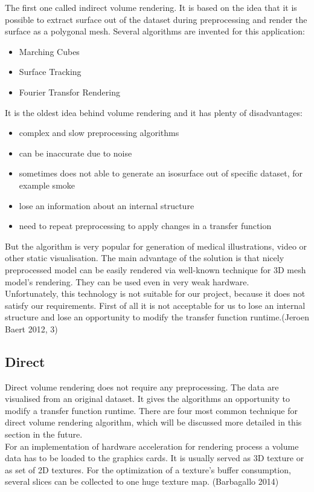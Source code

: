 \documentclass[twoside, english, 11pt]{report}
\begin{document}
The first one called indirect volume rendering. It is based on the idea that it is possible to extract surface out of the dataset during preprocessing and render the surface as a polygonal mesh. Several algorithms are invented for this application:
\begin{itemize}
\item Marching Cubes
\item Surface Tracking
\item Fourier Transfor Rendering
\end{itemize}
It is the oldest idea behind volume rendering and it has plenty of disadvantages:
\begin{itemize}
\item complex and slow preprocessing algorithms
\item can be inaccurate due to noise
\item sometimes does not able to generate an isosurface out of specific dataset, for example smoke
\item lose an information about an internal structure
\item need to repeat preprocessing to apply changes in a transfer function
\end{itemize}

But the algorithm is very popular for generation of medical illustrations, video or other static visualisation. The main advantage of the solution is that nicely preprocessed model can be easily rendered via well-known technique for 3D mesh model's rendering. They can be used even in very weak hardware.\\

Unfortunately, this technology is not suitable for our project, because it does not satisfy our requirements. First of all it is not acceptable for us to lose an internal structure and lose an opportunity to modify the transfer function runtime.(Jeroen Baert 2012, 3)

\subsection{Direct}
Direct volume rendering does not require any preprocessing. The data are visualised from an original dataset. It gives the algorithms an opportunity to modify a transfer function runtime. There are four most common technique for direct volume rendering algorithm, which will be discussed more detailed in this section in the future.\\

For an implementation of hardware acceleration for rendering process a volume data has to be loaded to the graphics cards. It is usually served as 3D texture or as set of 2D textures. For the optimization of a texture's buffer consumption, several slices can be collected to one huge texture map. (Barbagallo 2014) 
\end{document}
